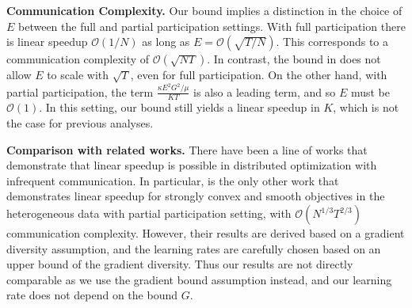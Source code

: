 %
\begin{remark}
	\textbf{Communication Complexity.} Our bound implies a distinction
	in the choice of $E$ between the full and partial participation settings.
	With full participation there is linear speedup $\mathcal{O}(1/N)$
	as long as $E=\mathcal{O}(\sqrt{T/N})$. This corresponds to a communication
	complexity of $\mathcal{O}(\sqrt{NT})$. In contrast, the bound in
	\cite{li2019convergence} does not allow $E$ to scale with $\sqrt{T}$,
	even for full participation. On the other hand, with partial participation,
	the term $\frac{\kappa E^{2}G^{2}/\mu}{KT}$ is also a leading term,
	and so $E$ must be $\mathcal{O}(1)$. In this setting, our bound
	still yields a linear speedup in $K$, which is not the case for previous
	analyses. 
\end{remark}
%
\begin{remark}
	\textbf{Comparison with related works.} There have been a line of
	works that demonstrate that linear speedup is possible in distributed
	optimization with infrequent communication. In particular, \cite{haddadpour2019convergence}
	is the only other work that demonstrates linear speedup for strongly
	convex and smooth objectives in the heterogeneous data with partial
	participation setting, with $\mathcal{O}(N^{1/3}T^{2/3})$ communication
	complexity. However, their results are derived based on a gradient
	diversity assumption, and the learning rates are carefully chosen
	based on an upper bound of the gradient diversity. Thus our results
	are not directly comparable as we use the gradient bound assumption
	instead, and our learning rate does not depend on the bound $G$.
\end{remark}

